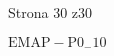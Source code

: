 \documentclass[a4paper,12pt]{article}
\begin{document}
Strona 30 z30

$\mathrm{E}\mathrm{M}\mathrm{A}\mathrm{P}-\mathrm{P}0_{-}10$
\end{document}
